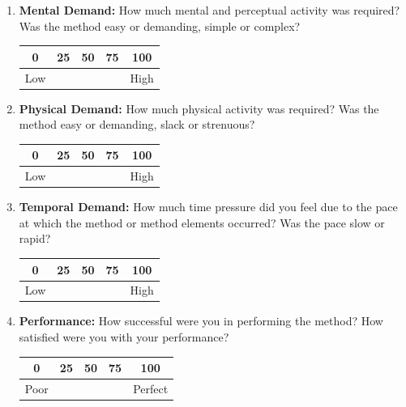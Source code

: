 \begin{enumerate}
    \item \textbf{Mental Demand:} How much mental and perceptual activity was required? Was the method easy or demanding, simple or complex?
    \begin{center}
        \begin{tabular}{|c|c|c|c|c|}
        \hline
        0 & 25 & 50 & 75 & 100 \\
        \hline
        Low & & & & High \\
        \hline
        \end{tabular}
    \end{center}
    
    \item \textbf{Physical Demand:} How much physical activity was required? Was the method easy or demanding, slack or strenuous?
    \begin{center}
        \begin{tabular}{|c|c|c|c|c|}
        \hline
        0 & 25 & 50 & 75 & 100 \\
        \hline
        Low & & & & High \\
        \hline
        \end{tabular}
    \end{center}
    
    \item \textbf{Temporal Demand:} How much time pressure did you feel due to the pace at which the method or method elements occurred? Was the pace slow or rapid?
    \begin{center}
        \begin{tabular}{|c|c|c|c|c|}
        \hline
        0 & 25 & 50 & 75 & 100 \\
        \hline
        Low & & & & High \\
        \hline
        \end{tabular}
    \end{center}
    
    \item \textbf{Performance:} How successful were you in performing the method? How satisfied were you with your performance?
    \begin{center}
        \begin{tabular}{|c|c|c|c|c|}
        \hline
        0 & 25 & 50 & 75 & 100 \\
        \hline
        Poor & & & & Perfect \\
        \hline
        \end{tabular}
    \end{center}
    

\end{enumerate}
